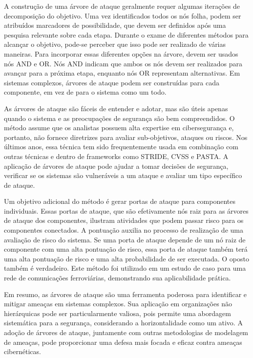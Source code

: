 A construção de uma árvore de ataque geralmente requer algumas iterações de
decomposição do objetivo. Uma vez identificados todos os nós folha, podem ser atribuídos
marcadores de possibilidade, que devem ser definidos após uma pesquisa relevante sobre
cada etapa. Durante o exame de diferentes métodos para alcançar o objetivo, pode-se
perceber que isso pode ser realizado de várias maneiras. Para incorporar essas
diferentes opções na árvore, devem ser usados nós AND e OR. Nós AND indicam que ambos os
nós devem ser realizados para avançar para a próxima etapa, enquanto nós OR
representam alternativas. Em sistemas complexos, árvores de ataque
podem ser construídas para cada componente, em vez de para o sistema como um todo. 

As árvores de ataque são fáceis de entender e adotar, mas são úteis apenas
quando o sistema e as preocupações de segurança são bem compreendidos. O método
assume que os analistas possuem alta expertise em cibersegurança e, portanto, não
fornece diretrizes para avaliar sub-objetivos, ataques ou riscos.
Nos últimos anos, essa técnica tem sido frequentemente usada em combinação com
outras técnicas e dentro de frameworks como STRIDE, CVSS e PASTA.
A aplicação de árvores de ataque pode ajudar a tomar decisões de segurança,
verificar se os sistemas são vulneráveis a um ataque e avaliar um tipo específico de
ataque. 

Um objetivo adicional do método é gerar portas de ataque para componentes
individuais. Essas portas de ataque, que são efetivamente nós raiz para as árvores de
ataque dos componentes, ilustram atividades que podem passar risco para os
componentes conectados. A pontuação auxilia no processo de realização de uma avaliação de
risco do sistema. Se uma porta de ataque depende de um nó raiz de componente com uma
alta pontuação de risco, essa porta de ataque também terá uma alta pontuação de
risco e uma alta probabilidade de ser executada. O oposto também é verdadeiro.
Este método foi utilizado em um estudo de caso para uma rede de comunicações
ferroviárias, demonstrando sua aplicabilidade prática. 

Em resumo, as árvores de ataque são uma ferramenta poderosa para identificar e
mitigar ameaças em sistemas complexos. Sua aplicação em organizações não hierárquicas
pode ser particularmente valiosa, pois permite uma abordagem sistemática para a
segurança, considerando a horizontalidade como um ativo. A adoção de árvores de ataque,
juntamente com outras metodologias de modelagem de ameaças, pode proporcionar uma defesa
mais focada e eficaz contra ameaças cibernéticas. 

